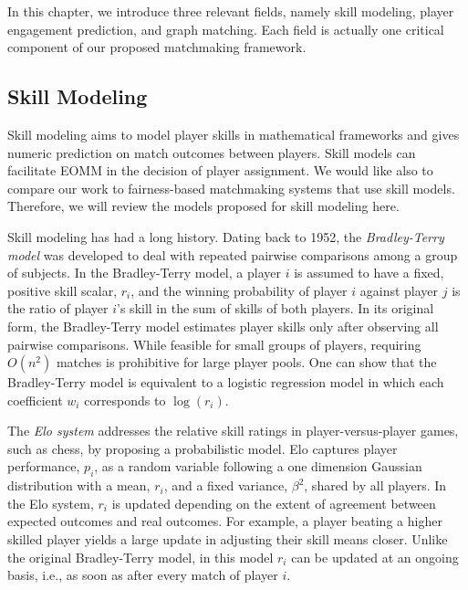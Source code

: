 In this chapter, we introduce three relevant fields, namely skill modeling, player engagement prediction, and graph matching. Each field is actually one critical component of our proposed matchmaking framework.


\subsection{Skill Modeling}\label{sec:skill_review}
Skill modeling aims to model player skills in mathematical frameworks and gives numeric  prediction on match outcomes between players. Skill models can facilitate EOMM in the decision of player assignment. We would like also to compare our work to fairness-based matchmaking systems that use skill models.  Therefore, we will review the models proposed for skill modeling here. 


Skill modeling has had a long history. Dating back to 1952, the \textit{Bradley-Terry model} \citep{bradley1952rank} was developed to deal with repeated pairwise comparisons among a group of subjects. In the Bradley-Terry model, a player $i$ is assumed to have a fixed, positive skill scalar, $r_i$, and the winning probability of player $i$ against player $j$ is the ratio of player $i$'s skill in the sum of skills of both players. In its original form, the Bradley-Terry model estimates player skills only after observing all pairwise comparisons. While feasible for small groups of players, requiring $O(n^2)$ matches is prohibitive for large player pools. One can show that the Bradley-Terry model is equivalent to a logistic regression model \citep{agresti2011categorical} in which each coefficient $w_i$ corresponds to $\log(r_i)$.

The \textit{Elo system} \citep{elo1978rating} addresses the relative skill ratings in player-versus-player games, such as chess, by proposing a probabilistic model. Elo captures player performance, $p_i$, as a random variable following a one dimension Gaussian distribution with a mean, $r_i$, and a fixed variance, $\beta^2$, shared by all players. In the Elo system, $r_i$ is updated depending on the extent of agreement between expected outcomes and real outcomes. For example, a player beating a higher skilled player yields a large update in adjusting their skill means closer. Unlike the original Bradley-Terry model, in this model $r_i$ can be updated at an ongoing basis, i.e., as soon as after every match of player $i$.

